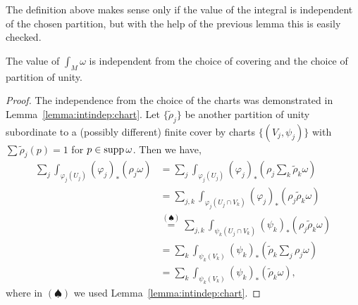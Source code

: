 The definition above makes sense only if the value of the integral is independent of the chosen partition, but with the help of the previous lemma this is easily checked.

\begin{lemma}\label{lemma:intinman}
  The value of $\int_M\omega$ is independent from the choice of covering and the choice of partition of unity.
\end{lemma}
\begin{proof}
  The independence from the choice of the charts was demonstrated in Lemma~\ref{lemma:intindep:chart}.
  Let $\{\widetilde\rho_j\}$ be another partition of unity subordinate to a (possibly different) finite cover by charts $\{(V_j, \psi_j)\}$ with $\sum \widetilde\rho_j(p) = 1$ for $p\in\operatorname{supp}\omega$.
  Then we have,
  \begin{align}
    \sum_j \int_{\varphi_j(U_j)} (\varphi_j)_*\left(\rho_j \omega\right)
     & = \sum_j \int_{\varphi_j(U_j)} (\varphi_j)_*\left(\rho_j \sum_k \widetilde\rho_k\omega\right)                         \\
     & = \sum_{j,k} \int_{\varphi_j(U_j\cap V_k)} (\varphi_j)_* \left(\rho_j \widetilde\rho_k\omega\right)                   \\
     & \overset{(\spadesuit)}{=} \sum_{j,k} \int_{\psi_k(U_j\cap V_k)} (\psi_k)_* \left(\rho_j \widetilde\rho_k\omega\right) \\
     & = \sum_k \int_{\psi_k(V_k)} (\psi_k)_*\left(\widetilde\rho_k \sum_j\rho_j \omega\right)                               \\
     & = \sum_k \int_{\psi_k(V_k)} (\psi_k)_*\left( \widetilde\rho_k \omega\right),
  \end{align}
  where in $(\spadesuit)$ we used Lemma~\ref{lemma:intindep:chart}.
\end{proof}

